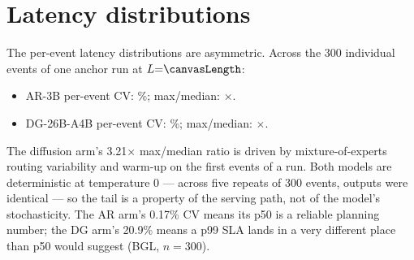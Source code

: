 \section{Latency distributions}
\label{app:distributions} The per-event latency distributions are asymmetric. Across the 300 individual
events of one anchor run at $L{=}\canvasLength$:
\begin{itemize}[nosep]
\item AR-3B per-event CV: \arEventCV\%; max/median: \arMaxMed$\times$.
\item DG-26B-A4B per-event CV: \dgEventCV\%; max/median: \dgMaxMed$\times$.
\end{itemize}
The diffusion arm's 3.21$\times$ max/median ratio is driven by
mixture-of-experts routing variability and warm-up on the first events of a
run. Both models are deterministic at temperature 0 --- across five repeats of
300 events, outputs were identical --- so the tail is a property of the
serving path, not of the model's stochasticity. The AR arm's 0.17\% CV means
its p50 is a reliable planning number; the DG arm's 20.9\% means a p99 SLA
lands in a very different place than p50 would suggest
(BGL, $n{=}300$).
